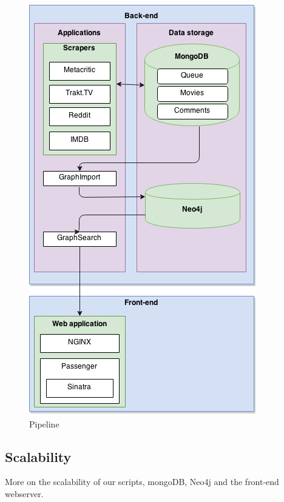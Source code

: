 \begin{figure}[H]
	\centering
	\includegraphics[width=\linewidth]{pipeline.png}
	\caption{Pipeline}
\end{figure}

\subsection{Scalability}
\label{sec:arch:scalability} 
More on the scalability of our scripts, mongoDB, Neo4j and the front-end webserver.